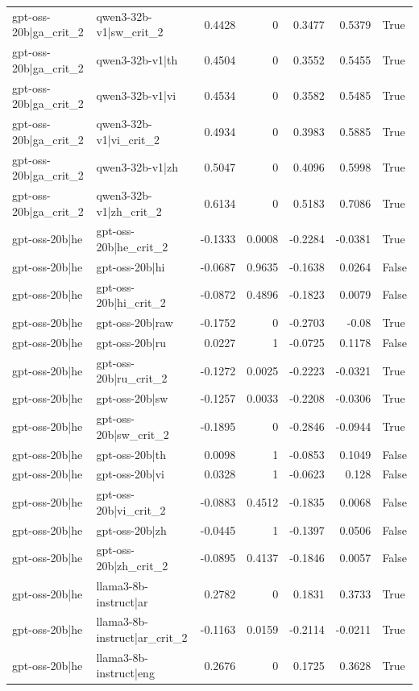 \begin{table}
\begin{tabular}{l l r r r r l}
gpt-oss-20b|ga_crit_2 & qwen3-32b-v1|sw_crit_2 & 0.4428 & 0 & 0.3477 & 0.5379 & True \\
gpt-oss-20b|ga_crit_2 & qwen3-32b-v1|th & 0.4504 & 0 & 0.3552 & 0.5455 & True \\
gpt-oss-20b|ga_crit_2 & qwen3-32b-v1|vi & 0.4534 & 0 & 0.3582 & 0.5485 & True \\
gpt-oss-20b|ga_crit_2 & qwen3-32b-v1|vi_crit_2 & 0.4934 & 0 & 0.3983 & 0.5885 & True \\
gpt-oss-20b|ga_crit_2 & qwen3-32b-v1|zh & 0.5047 & 0 & 0.4096 & 0.5998 & True \\
gpt-oss-20b|ga_crit_2 & qwen3-32b-v1|zh_crit_2 & 0.6134 & 0 & 0.5183 & 0.7086 & True \\
gpt-oss-20b|he & gpt-oss-20b|he_crit_2 & -0.1333 & 0.0008 & -0.2284 & -0.0381 & True \\
gpt-oss-20b|he & gpt-oss-20b|hi & -0.0687 & 0.9635 & -0.1638 & 0.0264 & False \\
gpt-oss-20b|he & gpt-oss-20b|hi_crit_2 & -0.0872 & 0.4896 & -0.1823 & 0.0079 & False \\
gpt-oss-20b|he & gpt-oss-20b|raw & -0.1752 & 0 & -0.2703 & -0.08 & True \\
gpt-oss-20b|he & gpt-oss-20b|ru & 0.0227 & 1 & -0.0725 & 0.1178 & False \\
gpt-oss-20b|he & gpt-oss-20b|ru_crit_2 & -0.1272 & 0.0025 & -0.2223 & -0.0321 & True \\
gpt-oss-20b|he & gpt-oss-20b|sw & -0.1257 & 0.0033 & -0.2208 & -0.0306 & True \\
gpt-oss-20b|he & gpt-oss-20b|sw_crit_2 & -0.1895 & 0 & -0.2846 & -0.0944 & True \\
gpt-oss-20b|he & gpt-oss-20b|th & 0.0098 & 1 & -0.0853 & 0.1049 & False \\
gpt-oss-20b|he & gpt-oss-20b|vi & 0.0328 & 1 & -0.0623 & 0.128 & False \\
gpt-oss-20b|he & gpt-oss-20b|vi_crit_2 & -0.0883 & 0.4512 & -0.1835 & 0.0068 & False \\
gpt-oss-20b|he & gpt-oss-20b|zh & -0.0445 & 1 & -0.1397 & 0.0506 & False \\
gpt-oss-20b|he & gpt-oss-20b|zh_crit_2 & -0.0895 & 0.4137 & -0.1846 & 0.0057 & False \\
gpt-oss-20b|he & llama3-8b-instruct|ar & 0.2782 & 0 & 0.1831 & 0.3733 & True \\
gpt-oss-20b|he & llama3-8b-instruct|ar_crit_2 & -0.1163 & 0.0159 & -0.2114 & -0.0211 & True \\
gpt-oss-20b|he & llama3-8b-instruct|eng & 0.2676 & 0 & 0.1725 & 0.3628 & True \\

\end{tabular}
\end{table}
